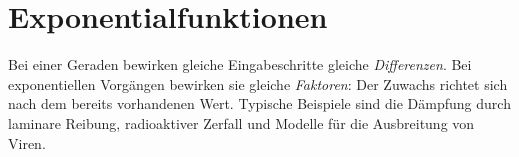\section{Exponentialfunktionen}
\label{sec:real_functions_exponential_functions}
Bei einer Geraden bewirken gleiche Eingabeschritte gleiche
\emph{Differenzen}. Bei exponentiellen Vorgängen bewirken sie
gleiche \emph{Faktoren}: Der Zuwachs richtet sich nach dem bereits
vorhandenen Wert.
Typische Beispiele sind die Dämpfung durch laminare Reibung,
radioaktiver Zerfall und Modelle für die Ausbreitung von Viren.


